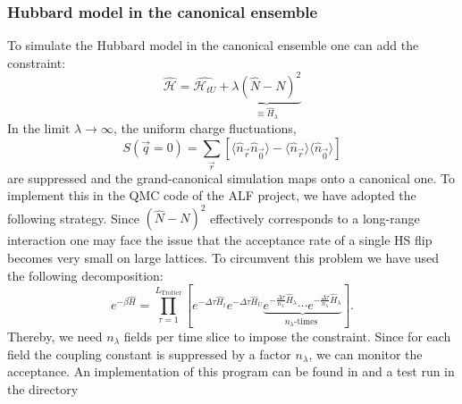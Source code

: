 \subsubsection{Hubbard  model in the canonical ensemble}

To simulate the Hubbard model in the canonical ensemble  one can add the constraint: 
\begin{equation}
	\hat{\mathcal{H}}   = \hat{\mathcal{H}_{tU}}     + \underbrace{\lambda \left( \hat{N} -  N \right)^{2}}_{\equiv \hat{H}_\lambda }
\end{equation}
In the limit $\lambda \rightarrow \infty $, the uniform charge fluctuations,
\begin{equation} 
      S ( \vec{q} = 0)   =  \sum_{\vec{r}}   \left[ \langle \hat{n}_{\vec{r}}  \hat{n}_{\vec{0}} \rangle  - \langle \hat{n}_{\vec{r}}\rangle \langle  \hat{n}_{\vec{0}} \rangle  \right]
\end{equation} 
are suppressed and the grand-canonical simulation maps onto a canonical one.  
To implement this in the QMC code of the ALF project,  we have adopted the following strategy.   Since  $ \left( \hat{N} -  N \right)^{2}  $ effectively corresponds to a long-range interaction one may   face the issue that the acceptance rate of a single  HS flip becomes very small on large lattices. To circumvent this problem we have  used the following decomposition: 
\begin{equation}
	e^{-\beta \hat{H}}  =   \prod_{\tau = 1}^{L_{\text{Trotter}}} \left[  e^{-\Delta \tau \hat{H}_t} e^{-\Delta \tau \hat{H}_U}  
	\underbrace{e^{-\frac{\Delta \tau}{n_{\lambda}} \hat{H}_{\lambda} } \cdots e^{-\frac{\Delta \tau}{n_{\lambda}} \hat{H}_{\lambda} } }_{n_\lambda \text{-times } }\right].
\end{equation}
Thereby, we need $n_\lambda $ fields per time slice  to impose the constraint.  Since for each field the coupling  constant is suppressed by a factor $n_{\lambda}$, we can monitor the acceptance. 
An implementation of this program can be found in    and a test run in the directory 
